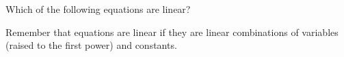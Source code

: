 \documentclass{ximera}
\author{Zack Reed}
\begin{document}
\begin{problem}

  Which of the following equations are linear?
  \begin{selectAll}
  \end{selectAll}

  \begin{hint}
    Remember that equations are linear if they are linear combinations of variables (raised to the first power) and constants.
  \end{hint}

\end{problem}
\end{document}
